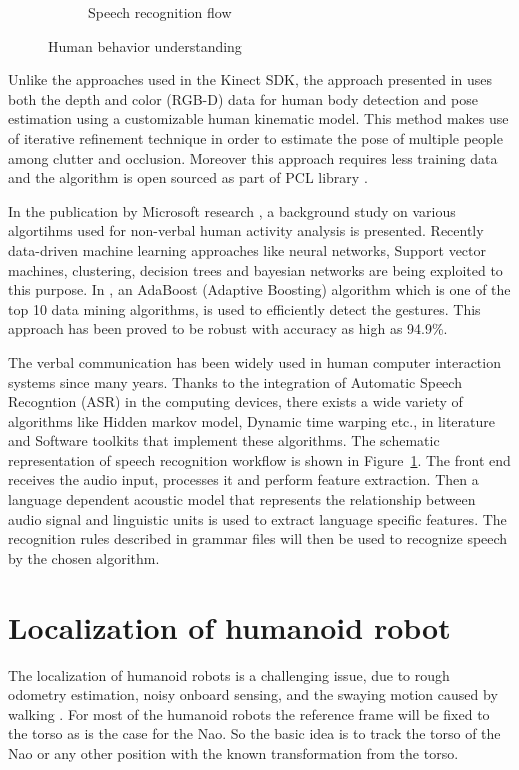 \begin{figure}
\begin{subfigure}[t]{0.48\textwidth}
\caption[Speech recognition flow]{Speech recognition flow}
\label{fig:speech_recog}
\end{subfigure}
\caption[Human behavior understanding]{Human behavior understanding}
\label{fig:behavior_understand}
\end{figure} 
Unlike the approaches used in the Kinect SDK, the approach presented in \cite{buys2014adaptable} uses both the depth and color (RGB-D) data for human body detection and pose estimation using a customizable human kinematic model. This method makes use of iterative refinement technique in order to estimate the pose of multiple people among clutter and occlusion. Moreover this approach requires less training data and the algorithm is open sourced as part of PCL library \cite{rusu20113d}.  

In the publication by Microsoft research \cite{han2013enhanced}, a background study on various algortihms used for non-verbal human activity analysis is presented. Recently \cite{KinectSDK2014} data-driven machine learning approaches like neural networks, Support vector machines, clustering, decision trees and bayesian networks are being exploited to this purpose. In \cite{KinectSDK2014}, an AdaBoost (Adaptive Boosting) algorithm \cite{freund1997decision} which is one of the top 10 data mining algorithms, is used to efficiently detect the gestures. This approach has been proved to be robust with accuracy as high as 94.9\%. 

The verbal communication has been widely used in human computer interaction systems since many years. Thanks to the integration of Automatic Speech Recogntion (ASR) in the computing devices, there exists a wide variety of algorithms like Hidden markov model, Dynamic time warping etc., in literature \cite{reddy1976speech} \cite{lippmann1997speech} and Software toolkits \cite{SpeechSdk} that implement these algorithms. The schematic representation of speech recognition workflow is shown in Figure~\ref{fig:speech_recog}. The front end receives the audio input, processes it and perform feature extraction. Then a language dependent acoustic model that represents the relationship between audio signal and linguistic units is used to extract language specific features. The recognition rules described in grammar files will then be used to recognize speech by the chosen algorithm.

\section{Localization of humanoid robot} %
The localization of humanoid robots is a challenging issue, due to rough odometry estimation, noisy onboard sensing, and the swaying motion caused by walking \cite{cervera2012localization}. For most of the humanoid robots the reference frame will be fixed to the torso as is the case for the Nao. So the basic idea is to track the torso of the Nao or any other position with the known transformation from the torso.
